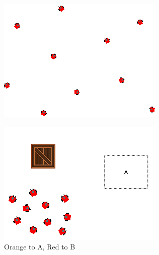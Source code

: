 \documentclass[]{article}
\begin{document}
\begin{figure}
\begin{subfigure}{0.42\textwidth}
		\includegraphics[width=\linewidth]{slide_images/Swarm_Robot_Control_-_10_Robot_0023.png}
		\caption{}
		\label{fig:sub1}
	\end{subfigure}%
	\begin{subfigure}{0.42\textwidth}
		\centering
		\includegraphics[width=\linewidth]{slide_images/Swarm_Robot_Control_-_10_Robot_0025.png}
		\caption{Orange to A, Red to B}
		\label{fig:sub1}
	\end{subfigure}
	\begin{subfigure}{0.42\textwidth}
		\centering

\end{subfigure}
\end{figure}
\end{document}
